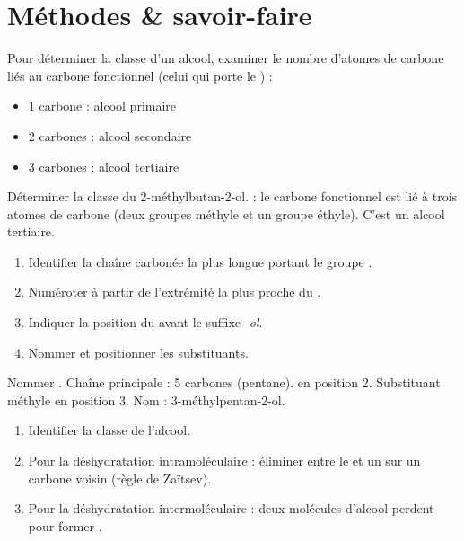 \section{Méthodes \& savoir-faire}

Pour déterminer la classe d'un alcool, examiner le nombre d'atomes de carbone liés au carbone fonctionnel (celui qui porte le ) :
\begin{itemize}
\item 1 carbone : alcool primaire
\item 2 carbones : alcool secondaire
\item 3 carbones : alcool tertiaire
\end{itemize}

\begin{exemple}
Déterminer la classe du 2-méthylbutan-2-ol.
 : le carbone fonctionnel est lié à trois atomes de carbone (deux groupes méthyle et un groupe éthyle). C'est un alcool tertiaire.
\end{exemple}

\begin{enumerate}
\item Identifier la chaîne carbonée la plus longue portant le groupe .
\item Numéroter à partir de l'extrémité la plus proche du .
\item Indiquer la position du  avant le suffixe \textit{-ol}.
\item Nommer et positionner les substituants.
\end{enumerate}

\begin{exemple}
Nommer .
Chaîne principale : 5 carbones (pentane).  en position 2. Substituant méthyle en position 3. Nom : 3-méthylpentan-2-ol.
\end{exemple}

\begin{enumerate}
\item Identifier la classe de l'alcool.
\item Pour la déshydratation intramoléculaire : éliminer  entre le  et un  sur un carbone voisin (règle de Zaïtsev).
\item Pour la déshydratation intermoléculaire : deux molécules d'alcool perdent  pour former .
\end{enumerate}

